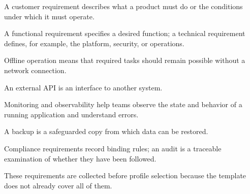 \begin{beginnerstatement}

A customer requirement describes what a product must do or the conditions
under which it must operate.

A functional requirement specifies a desired function; a technical
requirement defines, for example, the platform, security, or operations.

Offline operation means that required tasks should remain possible without a
network connection.

An external API is an interface to another system.

Monitoring and observability help teams observe the state and behavior of a
running application and understand errors.

A backup is a safeguarded copy from which data can be restored.

Compliance requirements record binding rules; an audit is a traceable
examination of whether they have been followed.

These requirements are collected before profile selection because the
template does not already cover all of them.

\end{beginnerstatement}
